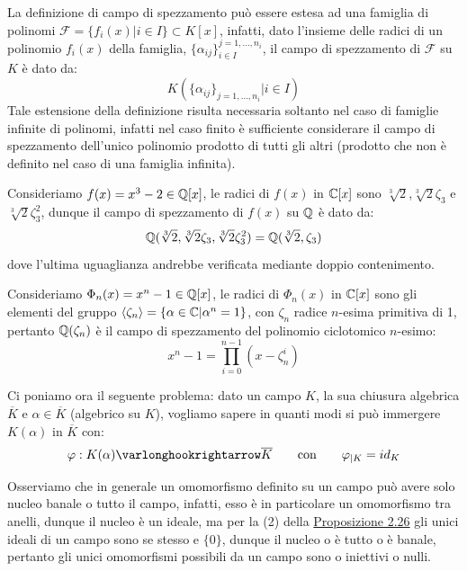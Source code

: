 \documentclass[11pt]{scrartcl}
\begin{document}
\begin{remark}
    La definizione di campo di spezzamento può essere estesa ad una famiglia di polinomi $\mathcal{F} = \{f_i(x) | i \in I\} \subset K[x]$, infatti, dato l'insieme delle radici di un polinomio $f_i(x)$ della famiglia,
    $ \{\alpha_{ij}\}_{i \in I}^{j = 1,\ldots,n_i} $, il campo di spezzamento di $\mathcal{F}$ su $K$ è dato da:
    \[ K(\{\alpha_{ij}\}_{j = 1,\ldots,n_i} | i \in I)
        \]
    Tale estensione della definizione risulta necessaria soltanto nel caso di famiglie infinite di polinomi, infatti nel caso finito è sufficiente considerare il campo di spezzamento dell'unico polinomio prodotto di tutti gli altri 
    (prodotto che non è definito nel caso di una famiglia infinita).
\end{remark}

\begin{example}
    Consideriamo $f(x) = x^3 - 2 \in \mathbb Q[x]$, le radici di $f(x)$ in $\mathbb C[x]$ sono $\sqrt[3]{2}$,$\sqrt[3]{2}\zeta_3$ e $\sqrt[3]{2}\zeta_3^2$, dunque il campo di spezzamento di $f(x)$ su $\mathbb Q$ è dato da:
    \[ \mathbb Q(\sqrt[3]{2},\sqrt[3]{2}\zeta_3,\sqrt[3]{2}\zeta_3^2) = \mathbb Q(\sqrt[3]{2},\zeta_3)
        \]
    dove l'ultima uguaglianza andrebbe verificata mediante doppio contenimento.
\end{example}

\begin{example}
    Consideriamo $\Phi_n(x) = x^n - 1 \in \mathbb Q[x]$, le radici di $\Phi_n(x)$ in $\mathbb C[x]$ sono gli elementi del gruppo $\left<\zeta_n\right> = \{\alpha \in \mathbb C | \alpha^n = 1\}$, con $\zeta_n$ radice $n$-esima primitiva di 1,
    pertanto $\mathbb Q(\zeta_n)$ è il campo di spezzamento del polinomio ciclotomico $n$-esimo:
    \[ x^n - 1 = \prod_{i = 0}^{n-1} (x - \zeta_n^i)
        \]
\end{example}

Ci poniamo ora il seguente problema: dato un campo $K$, la sua chiusura algebrica $\overline K$ e $\alpha \in \overline K$ (algebrico su $K$), vogliamo sapere in quanti modi si può immergere $K(\alpha)$ in $\overline K$ con:
\[ \varphi : K(\alpha) \varlonghookrightarrow \overline K \qquad \text{con} \qquad \varphi_{|K} = id_K
    \]

\begin{remark}
    \label{3.32}
Osserviamo che in generale un omomorfismo definito su un campo può avere solo nucleo banale o tutto il campo, infatti, esso è in particolare un omomorfismo tra anelli, dunque il nucleo è un ideale, ma per la (2) della \hyperref[2.26]{Proposizione 2.26} gli unici ideali di un campo 
sono se stesso e $\{0\}$, dunque il nucleo o è tutto o è banale, pertanto gli unici omomorfismi possibili da un campo sono o iniettivi o nulli.    
\end{remark}
\end{document}
